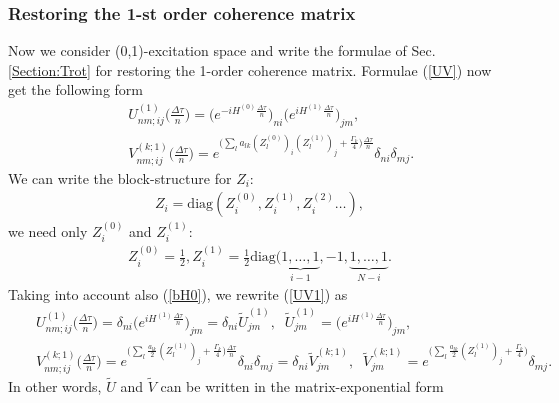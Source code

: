 \documentclass[pra,preprint,showpacs]{revtex4-1}
\begin{document}
{\subsubsection{Restoring the 1-st order coherence matrix}

Now we consider (0,1)-excitation space and write the formulae of Sec.\ref{Section:Trot} for restoring the 1-order coherence matrix. Formulae (\ref{UV}) now get the following form
\begin{eqnarray}\label{UV1}
&&
U^{(1)}_{nm;ij}\Big(\frac{\Delta \tau}{n}\Big) = \Big(e^{ -i H^{(0)}\frac{\Delta \tau}{n}} \Big)_{ni}\Big(e^{ i H^{(1)}\frac{\Delta \tau}{n}} \Big)_{jm}  ,\\\nonumber
&&
V^{(k;1)}_{nm;ij}\Big(\frac{\Delta \tau}{n}\Big) = e^{ \Big( \sum_l a_{lk} (Z^{(0)}_l)_{i}   (Z^{(1)}_l)_{j}  +\frac{\Gamma_k}{4}\Big)    \frac{\Delta \tau}{n}}  \delta_{ni}\delta_{mj}.
\end{eqnarray}
We can write the block-structure for $Z_i$:
\begin{eqnarray}
Z_i ={\mbox{diag}}(Z_i^{(0)}, Z_i^{(1)},Z_i^{(2)} \dots),
\end{eqnarray}
we need only $Z_i^{(0)}$ and $Z_i^{(1)}$:
\begin{eqnarray}
Z_i^{(0)} =\frac{1}{2}, Z_i^{(1)} = \frac{1}{2} {\mbox{diag}}( \underbrace{1,\dots,1}_{i-1}, -1, \underbrace{1,\dots,1}_{N-i}.
\end{eqnarray}
Taking into account also (\ref{bH0}), we rewrite (\ref{UV1}) as
\begin{eqnarray}\label{UV1}
&&
U^{(1)}_{nm;ij}\Big(\frac{\Delta \tau}{n}\Big) = \delta_{ni}\Big(e^{ i H^{(1)}\frac{\Delta \tau}{n}} \Big)_{jm}= \delta_{ni}\tilde U^{(1)}_{jm},\;\; \tilde U^{(1)}_{jm} = \Big(e^{ i H^{(1)}\frac{\Delta \tau}{n}} \Big)_{jm}  ,\\\nonumber
&&
V^{(k;1)}_{nm;ij}\Big(\frac{\Delta \tau}{n}\Big) = e^{ \Big( \sum_l \frac{a_{lk}}{2}    (Z^{(1)}_l)_{j}  +\frac{\Gamma_k}{4}\Big)    \frac{\Delta \tau}{n}}  \delta_{ni}\delta_{mj}  =\delta_{ni} \tilde V^{(k;1)}_{jm},\;\; \tilde V^{(k;1)}_{jm}=e^{ \Big( \sum_l \frac{a_{lk}}{2}    (Z^{(1)}_l)_{j}  +\frac{\Gamma_k}{4}\Big) }\delta_{mj}.
\end{eqnarray}
In other words, $\tilde U$ and $\tilde V$ can be written in the matrix-exponential form
%
}
\end{document}
